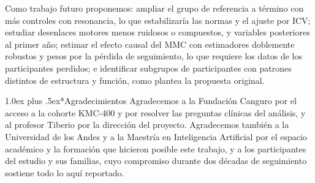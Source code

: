 \documentclass[conference,letterpaper,10pt]{IEEEtran}
\makeatletter
\def\section{\@startsection{section}{1}{\z@}{2.0ex plus 1ex minus .5ex}%
  {1.0ex plus .5ex}{\normalfont\normalsize\bfseries}}
\makeatother
\begin{document}
Como trabajo futuro proponemos: ampliar el grupo de referencia a término con más controles con resonancia, lo que estabilizaría las normas y el ajuste por ICV; estudiar desenlaces motores menos ruidosos o compuestos, y variables posteriores al primer año; estimar el efecto causal del MMC con estimadores doblemente robustos y pesos por la pérdida de seguimiento, lo que requiere los datos de los participantes perdidos; e identificar subgrupos de participantes con patrones distintos de estructura y función, como plantea la propuesta original.

\section*{Agradecimientos}
Agradecemos a la Fundación Canguro por el acceso a la cohorte KMC-400 y por resolver las preguntas clínicas del análisis, y al profesor Tiberio por la dirección del proyecto. Agradecemos también a la Universidad de los Andes y a la Maestría en Inteligencia Artificial por el espacio académico y la formación que hicieron posible este trabajo, y a los participantes del estudio y sus familias, cuyo compromiso durante dos décadas de seguimiento sostiene todo lo aquí reportado.
\end{document}
